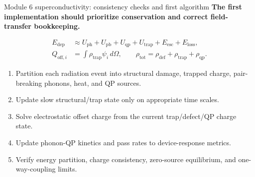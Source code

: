 \documentclass[aspectratio=169,10pt]{beamer}
\begin{document}
\begin{frame}{Module 6 superconductivity: consistency checks and first algorithm}
\footnotesize
\textbf{The first implementation should prioritize conservation and correct field-transfer bookkeeping.}

\vspace{-0.2em}
\begin{align*}
E_{\mathrm{dep}}&\approx U_{\mathrm{ph}}+U_{\mathrm{pb}}+U_{\mathrm{qp}}+U_{\mathrm{trap}}+E_{\mathrm{esc}}+E_{\mathrm{loss}},\\[-0.05em]
Q_{\mathrm{off},i}&=\int \rho_{\mathrm{trap}}\psi_i\,d\Omega,
\qquad
\rho_{\mathrm{tot}}=\rho_{\mathrm{def}}+\rho_{\mathrm{trap}}+\rho_{\mathrm{qp}}.
\end{align*}

\vspace{-0.25em}
\begin{enumerate}
    \item Partition each radiation event into structural damage, trapped charge, pair-breaking phonons, heat, and QP sources.
    \item Update slow structural/trap state only on appropriate time scales.
    \item Solve electrostatic offset charge from the current trap/defect/QP charge state.
    \item Update phonon-QP kinetics and pass rates to device-response metrics.
    \item Verify energy partition, charge consistency, zero-source equilibrium, and one-way-coupling limits.
\end{enumerate}
\end{frame}
\end{document}
